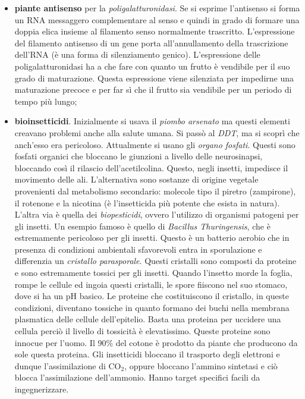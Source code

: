 \documentclass[]{article}
\begin{document}
\begin{itemize}
\itemsep1pt\parskip0pt
\item
  \textbf{piante antisenso} per la \emph{poligalatturonidasi}. Se si
  esprime l'antisenso si forma un RNA messaggero complementare al senso
  e quindi in grado di formare una doppia elica insieme al filamento
  senso normalmente trascritto. L'espressione del filamento antisenso di
  un gene porta all'annullamento della trascrizione dell'RNA (è una
  forma di silenziamento genico). L'espressione delle
  poligalatturonidasi ha a che fare con quanto un frutto è vendibile per
  il suo grado di maturazione. Questa espressione viene silenziata per
  impedirne una maturazione precoce e per far sì che il frutto sia
  vendibile per un periodo di tempo più lungo;
\item
  \textbf{bioinsetticidi}. Inizialmente si usava il \emph{piombo
  arsenato} ma questi elementi creavano problemi anche alla salute
  umana. Si passò al \emph{DDT}, ma si scoprì che anch'esso era
  pericoloso. Attualmente si usano gli \emph{organo fosfati}. Questi
  sono fosfati organici che bloccano le giunzioni a livello delle
  neurosinapsi, bloccando così il rilascio dell'acetilcolina. Questo,
  negli insetti, impedisce il movimento delle ali. L'alternativa sono
  sostanze di origine vegetale provenienti dal metabolismo secondario:
  molecole tipo il piretro (zampirone), il rotenone e la nicotina (è
  l'insetticida più potente che esista in natura). L'altra via è quella
  dei \emph{biopesticidi}, ovvero l'utilizzo di organismi patogeni per
  gli insetti. Un esempio famoso è quello di \emph{Bacillus
  Thuringensis}, che è estremamente pericoloso per gli insetti. Questo è
  un batterio aerobio che in presenza di condizioni ambientali
  sfavorevoli entra in sporulazione e differenzia un \emph{cristallo
  parasporale}. Questi cristalli sono composti da proteine e sono
  estremamente tossici per gli insetti. Quando l'insetto morde la
  foglia, rompe le cellule ed ingoia questi cristalli, le spore fiiscono
  nel suo stomaco, dove si ha un pH basico. Le proteine che
  costituiscono il cristallo, in queste condizioni, diventano tossiche
  in quanto formano dei buchi nella membrana plasmatica delle cellule
  dell'epitelio. Basta una proteina per uccidere una cellula perciò il
  livello di tossicità è elevatissimo. Queste proteine sono innocue per
  l'uomo. Il 90\% del cotone è prodotto da piante che producono da sole
  questa proteina. Gli insetticidi bloccano il trasporto degli elettroni
  e dunque l'assimilazione di CO$_2$, oppure bloccano l'ammino sintetasi
  e ciò blocca l'assimilazione dell'ammonio. Hanno target specifici
  facili da ingegnerizzare.
\end{itemize}
\end{document}
